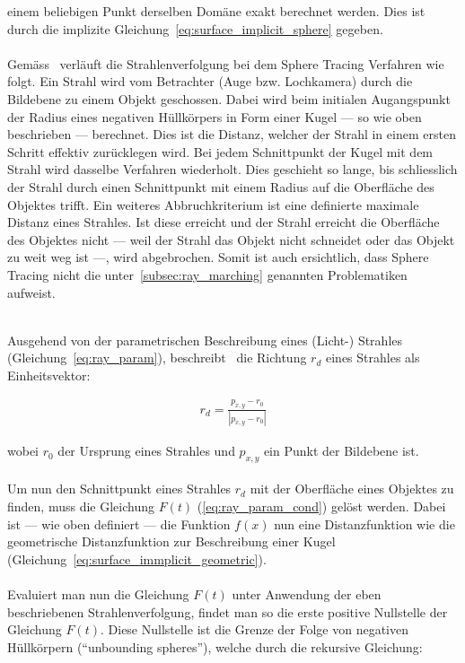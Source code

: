 einem beliebigen Punkt derselben Domäne exakt berechnet werden. Dies ist durch
die implizite Gleichung~\ref{eq:surface_implicit_sphere} gegeben.\\
\\
Gemäss~\cite{hart_ray_1989} verläuft die Strahlenverfolgung bei dem Sphere
Tracing Verfahren wie folgt. Ein Strahl wird vom Betrachter (Auge bzw.
Lochkamera) durch die Bildebene zu einem Objekt geschossen. Dabei wird beim
initialen Augangspunkt der Radius eines negativen Hüllkörpers in Form einer
Kugel --- so wie oben beschrieben --- berechnet. Dies ist die Distanz, welcher
der Strahl in einem ersten Schritt effektiv zurücklegen wird. Bei jedem
Schnittpunkt der Kugel mit dem Strahl wird dasselbe Verfahren wiederholt. Dies
geschieht so lange, bis schliesslich der Strahl durch einen Schnittpunkt mit
einem Radius auf die Oberfläche des Objektes trifft. Ein weiteres
Abbruchkriterium ist eine definierte maximale Distanz eines Strahles. Ist diese
erreicht und der Strahl erreicht die Oberfläche des Objektes nicht --- weil der
Strahl das Objekt nicht schneidet oder das Objekt zu weit weg ist ---, wird
abgebrochen. Somit ist auch ersichtlich, dass Sphere Tracing nicht die
unter~\ref{subsec:ray_marching} genannten Problematiken aufweist.\\
\\

Ausgehend von der parametrischen Beschreibung eines (Licht-) Strahles
(Gleichung~\ref{eq:ray_param}), beschreibt~\cite{hart_sphere_1994} die Richtung
$r_{d}$ eines Strahles als Einheitsvektor:

\begin{gather}
    r_{d} = \frac{p_{x, y} - r_{0}}{|p_{x, y} - r_{0}|}
\end{gather}

wobei $r_{0}$ der Ursprung eines Strahles und $p_{x, y}$ ein Punkt der Bildebene ist.\\
\\
Um nun den Schnittpunkt eines Strahles $r_{d}$ mit der Oberfläche eines
Objektes zu finden, muss die Gleichung $F(t)$ (\ref{eq:ray_param_cond}) gelöst
werden. Dabei ist --- wie oben definiert --- die Funktion $f(x)$ nun eine
Distanzfunktion wie die geometrische Distanzfunktion zur Beschreibung einer
Kugel (Gleichung~\ref{eq:surface_immplicit_geometric}).\\
\\
Evaluiert man nun die Gleichung $F(t)$ unter Anwendung der eben beschriebenen
Strahlenverfolgung, findet man so die erste positive Nullstelle der Gleichung
$F(t)$. Diese Nullstelle ist die Grenze der Folge von negativen Hüllkörpern
(``unbounding spheres''), welche durch die rekursive Gleichung:

